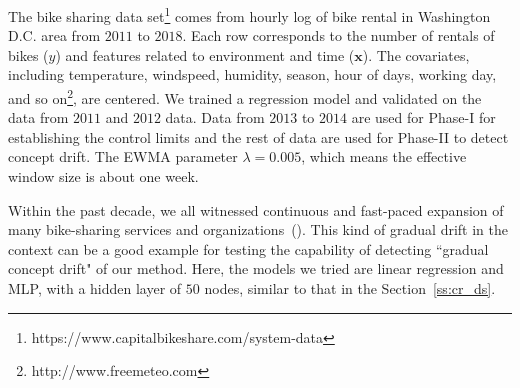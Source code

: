 \documentclass[twoside,11pt]{article}
\begin{document}
\begin{figure}[!htbp]
{%
}
\label{fig:bike_sharing}
\end{figure}

The bike sharing data set\footnote{https://www.capitalbikeshare.com/system-data} comes from hourly log of bike rental in Washington D.C. area from $2011$ to $2018$. Each row corresponds to the number of rentals of bikes ($y$) and features related to environment and time ($\bm {x}$). The covariates, including temperature, windspeed, humidity, season, hour of days, working day, and so on\footnote{http://www.freemeteo.com}, are centered. We trained a regression model and validated on the data from $2011$ and $2012$ data. Data from $2013$ to $2014$ are used for Phase-I for establishing the control limits and the rest of data are used for Phase-II to detect concept drift. The EWMA parameter $ \lambda = 0.005$, which means the effective window size is about one week.

Within the past decade, we all witnessed continuous and fast-paced expansion of many bike-sharing services and organizations~(\cite{shaheen2012public}). This kind of gradual drift in the context can be a good example for testing the capability of detecting ``gradual concept drift" of our method. Here, the models we tried are linear regression and MLP, with a hidden layer of $50$ nodes, similar to that in the Section~\ref{ss:cr_ds}.
\end{document}
